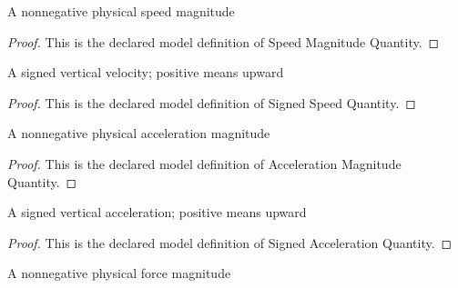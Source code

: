 \begin{definition}
  \label{def:physics:phyx-mini-0803:phyxminiproblems-problemphyxmini0803-speedmagnitudequantity}
  A nonnegative physical speed magnitude
\end{definition}
\begin{proof}
  This is the declared model definition of Speed Magnitude Quantity.
\end{proof}
\begin{definition}
  \label{def:physics:phyx-mini-0803:phyxminiproblems-problemphyxmini0803-signedspeedquantity}
  A signed vertical velocity; positive means upward
\end{definition}
\begin{proof}
  This is the declared model definition of Signed Speed Quantity.
\end{proof}
\begin{definition}
  \label{def:physics:phyx-mini-0803:phyxminiproblems-problemphyxmini0803-accelerationmagnitudequantity}
  A nonnegative physical acceleration magnitude
\end{definition}
\begin{proof}
  This is the declared model definition of Acceleration Magnitude Quantity.
\end{proof}
\begin{definition}
  \label{def:physics:phyx-mini-0803:phyxminiproblems-problemphyxmini0803-signedaccelerationquantity}
  A signed vertical acceleration; positive means upward
\end{definition}
\begin{proof}
  This is the declared model definition of Signed Acceleration Quantity.
\end{proof}
\begin{definition}
  \label{def:physics:phyx-mini-0803:phyxminiproblems-problemphyxmini0803-forcemagnitudequantity}
  A nonnegative physical force magnitude
\end{definition}
